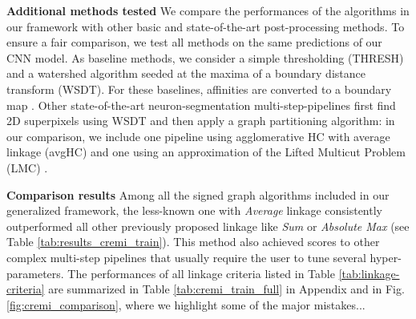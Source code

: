 \textbf{Additional methods tested }  We compare the performances of the algorithms in our framework with other basic and state-of-the-art post-processing methods. To ensure a fair comparison, we test all methods on the same predictions of our CNN model. As baseline methods, we consider a simple thresholding (THRESH) and a watershed algorithm seeded at the maxima of a boundary distance transform (WSDT). For these baselines, affinities are converted to a boundary map . Other state-of-the-art neuron-segmentation multi-step-pipelines first find 2D superpixels using WSDT and then apply a graph partitioning algorithm: in our comparison, we include one pipeline using agglomerative HC with average linkage (avgHC) and one using an approximation of the Lifted Multicut Problem (LMC) \cite{beier2016efficient}.

\textbf{Comparison results } Among all the signed graph algorithms included in our generalized framework, the less-known one with \emph{Average} linkage consistently outperformed all other previously proposed linkage like \emph{Sum} or \emph{Absolute Max}
(see Table \ref{tab:results_cremi_train}). This method also achieved  scores to other complex multi-step pipelines that usually require the user to tune several hyper-parameters. The performances of all linkage criteria listed in Table \ref{tab:linkage-criteria} are summarized in Table \ref{tab:cremi_train_full} in Appendix and in Fig. \ref{fig:cremi_comparison}, where we highlight some of the major mistakes... 




